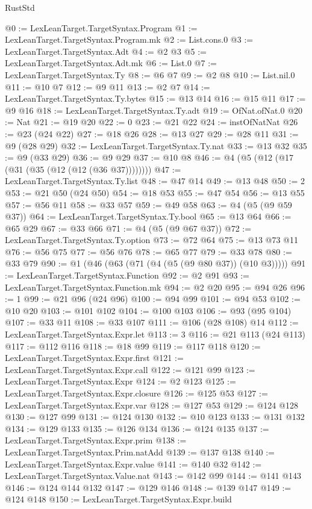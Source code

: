 \begin{lexlean}{RustStd}
\begin{coremodule}
{\begin{coremodule}
{{{{{{{{{{{{{{{{{{{{{{{{{{{{{{{{{{{{{@0 := LexLeanTarget.TargetSyntax.Program
@1 := LexLeanTarget.TargetSyntax.Program.mk
@2 := List.cons.{0}
@3 := LexLeanTarget.TargetSyntax.Adt
@4 := @2 @3
@5 := LexLeanTarget.TargetSyntax.Adt.mk
@6 := List.{0}
@7 := LexLeanTarget.TargetSyntax.Ty
@8 := @6 @7
@9 := @2 @8
@10 := List.nil.{0}
@11 := @10 @7
@12 := @9 @11
@13 := @2 @7
@14 := LexLeanTarget.TargetSyntax.Ty.bytes
@15 := @13 @14
@16 := @15 @11
@17 := @9 @16
@18 := LexLeanTarget.TargetSyntax.Ty.adt
@19 := OfNat.ofNat.{0}
@20 := Nat
@21 := @19 @20
@22 := 0
@23 := @21 @22
@24 := instOfNatNat
@26 := @23 (@24 @22)
@27 := @18 @26
@28 := @13 @27
@29 := @28 @11
@31 := @9 (@28 @29)
@32 := LexLeanTarget.TargetSyntax.Ty.nat
@33 := @13 @32
@35 := @9 (@33 @29)
@36 := @9 @29
@37 := @10 @8
@46 := @4 (@5 (@12 (@17 (@31 (@35 (@12 (@12 (@36 @37))))))))
@47 := LexLeanTarget.TargetSyntax.Ty.list
@48 := @47 @14
@49 := @13 @48
@50 := 2
@53 := @21 @50 (@24 @50)
@54 := @18 @53
@55 := @47 @54
@56 := @13 @55
@57 := @56 @11
@58 := @33 @57
@59 := @49 @58
@63 := @4 (@5 (@9 @59 @37))
@64 := LexLeanTarget.TargetSyntax.Ty.bool
@65 := @13 @64
@66 := @65 @29
@67 := @33 @66
@71 := @4 (@5 (@9 @67 @37))
@72 := LexLeanTarget.TargetSyntax.Ty.option
@73 := @72 @64
@75 := @13 @73 @11
@76 := @56 @75
@77 := @56 @76
@78 := @65 @77
@79 := @33 @78
@80 := @33 @79
@90 := @1 (@46 (@63 (@71 (@4 (@5 (@9 @80 @37)) (@10 @3)))))
@91 := LexLeanTarget.TargetSyntax.Function
@92 := @2 @91
@93 := LexLeanTarget.TargetSyntax.Function.mk
@94 := @2 @20
@95 := @94 @26
@96 := 1
@99 := @21 @96 (@24 @96)
@100 := @94 @99
@101 := @94 @53
@102 := @10 @20
@103 := @101 @102
@104 := @100 @103
@106 := @93 (@95 @104)
@107 := @33 @11
@108 := @33 @107
@111 := @106 (@28 @108) @14
@112 := LexLeanTarget.TargetSyntax.Expr.let
@113 := 3
@116 := @21 @113 (@24 @113)
@117 := @112 @116
@118 := @18 @99
@119 := @117 @118
@120 := LexLeanTarget.TargetSyntax.Expr.first
@121 := LexLeanTarget.TargetSyntax.Expr.call
@122 := @121 @99
@123 := LexLeanTarget.TargetSyntax.Expr
@124 := @2 @123
@125 := LexLeanTarget.TargetSyntax.Expr.closure
@126 := @125 @53
@127 := LexLeanTarget.TargetSyntax.Expr.var
@128 := @127 @53
@129 := @124 @128
@130 := @127 @99
@131 := @124 @130
@132 := @10 @123
@133 := @131 @132
@134 := @129 @133
@135 := @126 @134
@136 := @124 @135
@137 := LexLeanTarget.TargetSyntax.Expr.prim
@138 := LexLeanTarget.TargetSyntax.Prim.natAdd
@139 := @137 @138
@140 := LexLeanTarget.TargetSyntax.Expr.value
@141 := @140 @32
@142 := LexLeanTarget.TargetSyntax.Value.nat
@143 := @142 @99
@144 := @141 @143
@146 := @124 @144 @132
@147 := @129 @146
@148 := @139 @147
@149 := @124 @148
@150 := LexLeanTarget.TargetSyntax.Expr.build
}}}}}}}}}}}}}}}}}}}}}}}}}}}}}}}}}}}}}
\end{coremodule}}
\end{coremodule}
\end{lexlean}
